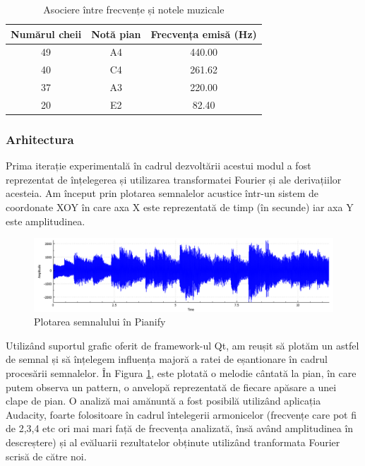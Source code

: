 \documentclass[a4paper,12pt]{report}
\begin{document}
   	
   \begin{table}[htbp]
   \centering
   \begin{tabular}{ |c|c|c| } 
   		\hline
   		Numărul cheii & Notă pian & Frecvența emisă (Hz) \\
   		\hline
   		49 & A4 & 440.00 \\ 
   		\hline
   		40 & C4 & 261.62  \\
   		\hline
   		37 & A3 & 220.00  \\
   		\hline
   		20 & E2 & 82.40  \\
   		\hline
   \end{tabular}	
   \caption{Asociere între frecvențe și notele muzicale}
   \label{tab:freq_to_tab}
   \end{table}
	
	\subsubsection{Arhitectura}
	Prima iterație experimentală în cadrul dezvoltării acestui modul a fost reprezentat de înțelegerea și utilizarea transformatei Fourier și ale derivațiilor acesteia. Am început prin plotarea semnalelor acustice într-un sistem de coordonate XOY în care axa X este reprezentată de timp (în secunde) iar axa Y este amplitudinea. 
	
	\begin{figure}[H]
		\begin{center}
			\includegraphics[width=\linewidth]{images/pianify_signal_plot.PNG}
		\end{center}
		\caption{Plotarea semnalului în Pianify}
		\label{fig:pianify_signal_plot}
	\end{figure}
    
    Utilizând suportul grafic oferit de framework-ul Qt, am reușit să plotăm un astfel de semnal și să înțelegem influența majoră a ratei de eșantionare în cadrul procesării semnalelor. În Figura \ref{fig:pianify_signal_plot}, este plotată o melodie cântată la pian, în care putem observa un pattern, o anvelopă reprezentată de fiecare apăsare a unei clape de pian. O analiză mai amănuntă a fost posibilă utilizând aplicația Audacity, foarte folositoare în cadrul întelegerii armonicelor (frecvențe care pot fi de 2,3,4 etc ori mai mari față de frecvența analizată, însă având amplitudinea în descreștere) și al evăluarii rezultatelor obținute utilizând tranformata Fourier scrisă de către noi.
    
\end{document}
